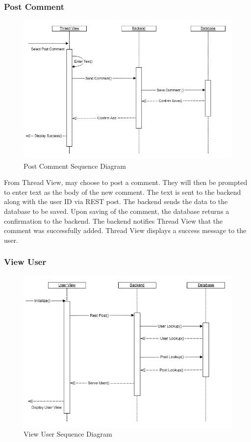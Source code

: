         \subsubsection{Post Comment}
            \begin{figure}[H]
                \centering
                \includegraphics[width=\textwidth]{src/img/post-comment.png}
                \caption{Post Comment Sequence Diagram} 
            \end{figure}

            From Thread View, may choose to post a comment. They will then be
            prompted to enter text as the body of the new comment. The text is
            sent to the backend along with the user ID via REST post. The
            backend sends the data to the database to be saved. Upon saving of
            the comment, the database returns a confirmation to the backend. The
            backend notifies Thread View that the comment was successfully
            added. Thread View displays a success message to the user.

        \subsubsection{View User}
            \begin{figure}[H]
                \centering
                \includegraphics[width=\textwidth]{src/img/view-user.png}
                \caption{View User Sequence Diagram} 
            \end{figure}

